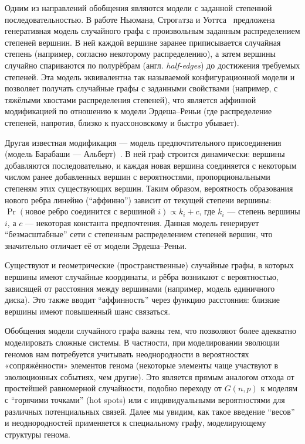 Одним из направлений обобщения являются модели с заданной степенной последовательностью.
В работе Ньюмана, Строгaтза и Уоттса~\cite{Newman2001} предложена генеративная модель случайного графа с произвольным заданным распределением степеней вершнин.
В ней каждой вершине заранее приписывается случайная степень (например, согласно некоторому распределению), а затем вершины случайно спариваются по полурёбрам (англ. \textit{half-edges}) до достижения требуемых степеней.
Эта модель эквивалентна так называемой конфигурационной модели и позволяет получать случайные графы с заданными свойствами (например, с тяжёлыми хвостами распределения степеней), что является аффинной модификацией по отношению к модели Эрдеша–Реньи (где распределение степеней, напротив, близко к пуассоновскому и быстро убывает).

Другая известная модификация — модель предпочтительного присоединения (модель Барабаши — Альберт)~\cite{Barabasi1999}. 
В ней граф строится динамически: вершины добавляются последовательно, и каждая новая вершина соединяется с некоторым числом ранее добавленных вершин с вероятностями, пропорциональными степеням этих существующих вершин. 
Таким образом, вероятность образования нового ребра линейно (``аффинно'') зависит от текущей степени вершины: $\Pr(\text{новое ребро соединится с вершиной } i) \propto k_i + c$, где $k_i$ — степень вершины $i$, а $c$ — некоторая константа предпочтения.
Данная модель генерирует ``безмасштабные'' сети с степенным распределением степеней вершин, что значительно отличает её от модели Эрдеша–Реньи. 

Существуют и геометрические (пространственные) случайные графы, в которых вершины имеют случайные координаты, и рёбра возникают с вероятностью, зависящей от расстояния между вершинами (например, модель единичного диска).
Это также вводит ``аффинность'' через функцию расстояния: близкие вершины имеют повышенный шанс связаться. 

Обобщения модели случайного графа важны тем, что позволяют более адекватно моделировать сложные системы.
В частности, при моделировании эволюции геномов нам потребуется учитывать неоднородности в вероятностях «сопряжённости» элементов генома (некоторые элементы чаще участвуют в эволюционных событиях, чем другие).
Это является прямым аналогом отхода от простейшей равномерной случайности, подобно переходу от $G(n,p)$ к моделям с ``горячими точками'' (hot spots) или с индивидуальными вероятностями для различных потенциальных связей.
Далее мы увидим, как такое введение ``весов'' и неоднородностей применяется к специальному графу, моделирующему структуры генома.

